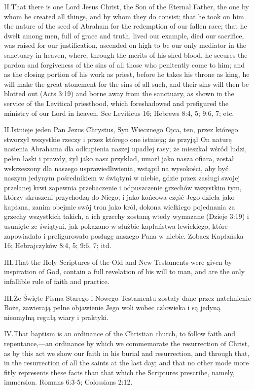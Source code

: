 \lettrine{II.} That there is one Lord Jesus Christ, the Son of the Eternal Father, the one by whom he created all things, and by whom they do consist; that he took on him the nature of the seed of Abraham for the redemption of our fallen race; that he dwelt among men, full of grace and truth, lived our example, died our sacrifice, was raised for our justification, ascended on high to be our only mediator in the sanctuary in heaven, where, through the merits of his shed blood, he secures the pardon and forgiveness of the sins of all those who penitently come to him; and as the closing portion of his work as priest, before he takes his throne as king, he will make the great atonement for the sins of all such, and their sins will then be blotted out (Acts 3:19) and borne away from the sanctuary, as shown in the service of the Levitical priesthood, which foreshadowed and prefigured the ministry of our Lord in heaven. See Leviticus 16; Hebrews 8:4, 5; 9:6, 7; etc.


\lettrine{II.} Istnieje jeden Pan Jezus Chrystus, Syn Wiecznego Ojca, ten, przez którego stworzył wszystkie rzeczy i przez którego one istnieją; że przyjął On naturę nasienia Abrahama dla odkupienia naszej upadłej rasy; że mieszkał wśród ludzi, pełen łaski i prawdy, żył jako nasz przykład, umarł jako nasza ofiara, został wskrzeszony dla naszego usprawiedliwienia, wstąpił na wysokości, aby być naszym jedynym pośrednikiem w świątyni w niebie, gdzie przez zasługi swojej przelanej krwi zapewnia przebaczenie i odpuszczenie grzechów wszystkim tym, którzy skruszeni przychodzą do Niego; i jako końcowa część Jego dzieła jako kapłana, zanim obejmie swój tron jako król, dokona wielkiego pojednania za grzechy wszystkich takich, a ich grzechy zostaną wtedy wymazane (Dzieje 3:19) i usunięte ze świątyni, jak pokazano w służbie kapłaństwa lewickiego, które zapowiadało i prefigurowało posługę naszego Pana w niebie. Zobacz Kapłańska 16; Hebrajczyków 8:4, 5; 9:6, 7; itd.


\lettrine{III.} That the Holy Scriptures of the Old and New Testaments were given by inspiration of God, contain a full revelation of his will to man, and are the only infallible rule of faith and practice.


\lettrine{III.} Że Święte Pisma Starego i Nowego Testamentu zostały dane przez natchnienie Boże, zawierają pełne objawienie Jego woli wobec człowieka i są jedyną nieomylną regułą wiary i praktyki.


\lettrine{IV.} That baptism is an ordinance of the Christian church, to follow faith and repentance,—an ordinance by which we commemorate the resurrection of Christ, as by this act we show our faith in his burial and resurrection, and through that, in the resurrection of all the saints at the last day; and that no other mode more fitly represents these facts than that which the Scriptures prescribe, namely, immersion. Romans 6:3-5; Colossians 2:12.


